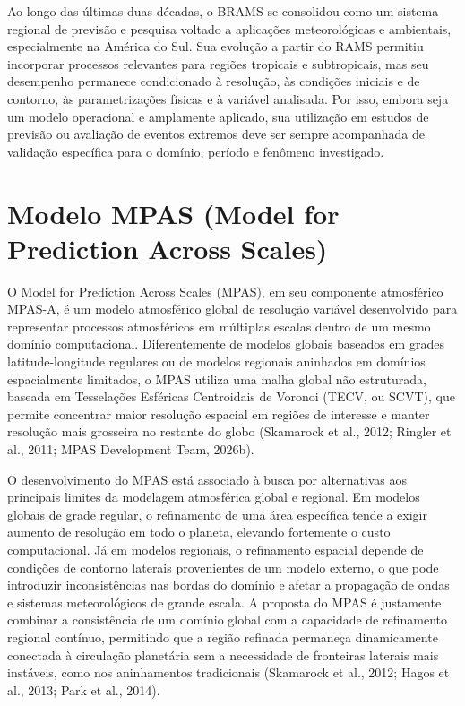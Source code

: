 \documentclass[12pt,a4paper,oneside]{book}
\begin{document}
Ao longo das últimas duas décadas, o BRAMS se consolidou como um sistema regional de previsão e pesquisa voltado a aplicações meteorológicas e ambientais, especialmente na América do Sul. Sua evolução a partir do RAMS permitiu incorporar processos relevantes para regiões tropicais e subtropicais, mas seu desempenho permanece condicionado à resolução, às condições iniciais e de contorno, às parametrizações físicas e à variável analisada. Por isso, embora seja um modelo operacional e amplamente aplicado, sua utilização em estudos de previsão ou avaliação de eventos extremos deve ser sempre acompanhada de validação específica para o domínio, período e fenômeno investigado.

\section{Modelo MPAS (Model for Prediction Across Scales)}

O Model for Prediction Across Scales (MPAS), em seu componente atmosférico MPAS-A, é um modelo atmosférico global de resolução variável desenvolvido para representar processos atmosféricos em múltiplas escalas dentro de um mesmo domínio computacional. Diferentemente de modelos globais baseados em grades latitude-longitude regulares ou de modelos regionais aninhados em domínios espacialmente limitados, o MPAS utiliza uma malha global não estruturada, baseada em Tesselações Esféricas Centroidais de Voronoi (TECV, ou SCVT), que permite concentrar maior resolução espacial em regiões de interesse e manter resolução mais grosseira no restante do globo (Skamarock et al., 2012; Ringler et al., 2011; MPAS Development Team, 2026b).

O desenvolvimento do MPAS está associado à busca por alternativas aos principais limites da modelagem atmosférica global e regional. Em modelos globais de grade regular, o refinamento de uma área específica tende a exigir aumento de resolução em todo o planeta, elevando fortemente o custo computacional. Já em modelos regionais, o refinamento espacial depende de condições de contorno laterais provenientes de um modelo externo, o que pode introduzir inconsistências nas bordas do domínio e afetar a propagação de ondas e sistemas meteorológicos de grande escala. A proposta do MPAS é justamente combinar a consistência de um domínio global com a capacidade de refinamento regional contínuo, permitindo que a região refinada permaneça dinamicamente conectada à circulação planetária sem a necessidade de fronteiras laterais mais instáveis, como nos aninhamentos tradicionais (Skamarock et al., 2012; Hagos et al., 2013; Park et al., 2014).
\end{document}
